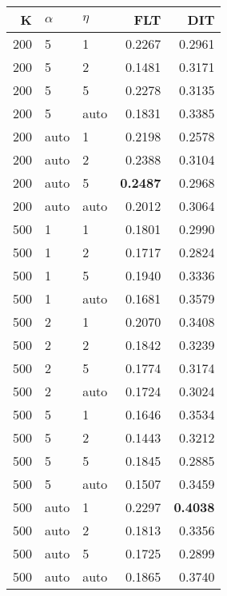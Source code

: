 \begin{table}
\begin{spacing}{1.2}
{\begin{tabular}{rll|rr}
\bottomrule
\end{tabular}
} \hfill \parbox{.45\linewidth}{\centering \begin{tabular}{rll|rr}
\toprule
   K & $\alpha$ &   $\eta$ & FLT &       DIT \\
\midrule
 200 &     5 &     1 &           0.2267 &       0.2961 \\
 200 &     5 &     2 &           0.1481 &       0.3171 \\
 200 &     5 &     5 &           0.2278 &       0.3135 \\
 200 &     5 &  auto &           0.1831 &       0.3385 \\
 200 &  auto &     1 &           0.2198 &       0.2578 \\
 200 &  auto &     2 &           0.2388 &       0.3104 \\
 200 &  auto &     5 &     {\bf 0.2487} &       0.2968 \\
 200 &  auto &  auto &           0.2012 &       0.3064 \\
 500 &     1 &     1 &           0.1801 &       0.2990 \\
 500 &     1 &     2 &           0.1717 &       0.2824 \\
 500 &     1 &     5 &           0.1940 &       0.3336 \\
 500 &     1 &  auto &           0.1681 &       0.3579 \\
 500 &     2 &     1 &           0.2070 &       0.3408 \\
 500 &     2 &     2 &           0.1842 &       0.3239 \\
 500 &     2 &     5 &           0.1774 &       0.3174 \\
 500 &     2 &  auto &           0.1724 &       0.3024 \\
 500 &     5 &     1 &           0.1646 &       0.3534 \\
 500 &     5 &     2 &           0.1443 &       0.3212 \\
 500 &     5 &     5 &           0.1845 &       0.2885 \\
 500 &     5 &  auto &           0.1507 &       0.3459 \\
 500 &  auto &     1 &           0.2297 & {\bf 0.4038} \\
 500 &  auto &     2 &           0.1813 &       0.3356 \\
 500 &  auto &     5 &           0.1725 &       0.2899 \\
 500 &  auto &  auto &           0.1865 &       0.3740 \\
\bottomrule
\end{tabular}
}
\end{spacing}
\end{table}
